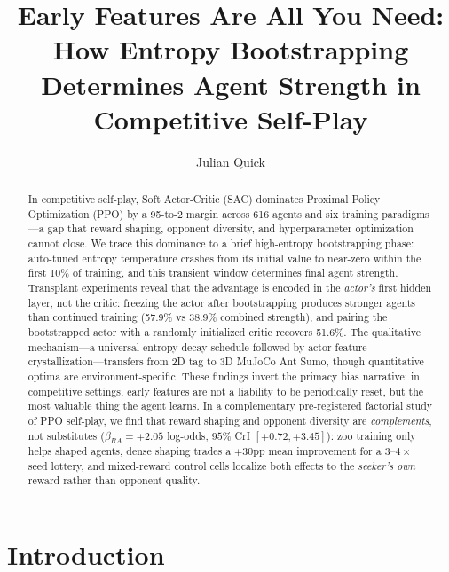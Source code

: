 \documentclass[letterpaper]{article}
\title{Early Features Are All You Need: How Entropy Bootstrapping\\Determines Agent Strength in Competitive Self-Play}
\author{
    Julian Quick \\
}
\begin{document}
\maketitle

\begin{abstract}
In competitive self-play, Soft Actor-Critic (SAC) dominates Proximal Policy Optimization (PPO) by a 95-to-2 margin across 616 agents and six training paradigms---a gap that reward shaping, opponent diversity, and hyperparameter optimization cannot close.
We trace this dominance to a brief high-entropy bootstrapping phase: auto-tuned entropy temperature crashes from its initial value to near-zero within the first 10\% of training, and this transient window determines final agent strength.
Transplant experiments reveal that the advantage is encoded in the \emph{actor's} first hidden layer, not the critic: freezing the actor after bootstrapping produces stronger agents than continued training (57.9\% vs 38.9\% combined strength), and pairing the bootstrapped actor with a randomly initialized critic recovers 51.6\%.
The qualitative mechanism---a universal entropy decay schedule followed by actor feature crystallization---transfers from 2D tag to 3D MuJoCo Ant Sumo, though quantitative optima are environment-specific.
These findings invert the primacy bias narrative: in competitive settings, early features are not a liability to be periodically reset, but the most valuable thing the agent learns.
In a complementary pre-registered factorial study of PPO self-play, we find that reward shaping and opponent diversity are \emph{complements}, not substitutes ($\beta_{RA}=+2.05$ log-odds, $95\%$ CrI $[+0.72,+3.45]$): zoo training only helps shaped agents, dense shaping trades a $+30$pp mean improvement for a $3$--$4\times$ seed lottery, and mixed-reward control cells localize both effects to the \emph{seeker's own} reward rather than opponent quality.
\end{abstract}

\section{Introduction}
\label{sec:intro}

\end{document}
